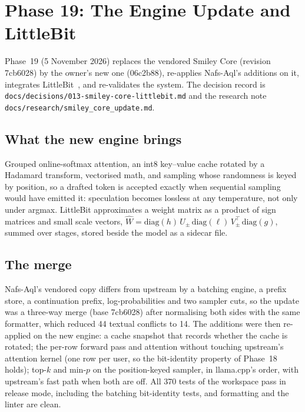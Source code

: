 \section{Phase 19: The Engine Update and LittleBit}
\label{sec:phase19}

Phase~19 (5 November 2026) replaces the vendored Smiley Core (revision 7cb6028) by the owner's new one (06c2b88), re-applies Nafs-Aql's additions on it,
integrates LittleBit~\cite{littlebit2025}, and re-validates the system. The decision record is \texttt{docs/decisions/013-smiley-core-littlebit.md} and
the research note \texttt{docs/research/smiley\_core\_update.md}.

\subsection{What the new engine brings}

Grouped online-softmax attention, an int8 key--value cache rotated by a Hadamard transform, vectorised math, and sampling whose randomness is keyed by
position, so a drafted token is accepted exactly when sequential sampling would have emitted it: speculation becomes lossless at any temperature, not
only under argmax. LittleBit approximates a weight matrix as a product of sign matrices and small scale vectors, $\hat W=\mathrm{diag}(h)\,U_{\pm}\,
\mathrm{diag}(\ell)\,V_{\pm}^{\top}\,\mathrm{diag}(g)$, summed over stages, stored beside the model as a sidecar file.

\subsection{The merge}

Nafs-Aql's vendored copy differs from upstream by a batching engine, a prefix store, a continuation prefix, log-probabilities and two sampler cuts, so
the update was a three-way merge (base 7cb6028) after normalising both sides with the same formatter, which reduced 44 textual conflicts to 14. The
additions were then re-applied on the new engine: a cache snapshot that records whether the cache is rotated; the per-row forward pass and attention
without touching upstream's attention kernel (one row per user, so the bit-identity property of Phase~18 holds); top-$k$ and min-$p$ on the
position-keyed sampler, in llama.cpp's order, with upstream's fast path when both are off. All 370 tests of the workspace pass in release mode,
including the batching bit-identity tests, and formatting and the linter are clean.

